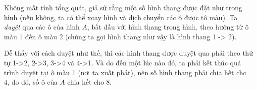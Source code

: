 \begin{ex}
{Không mất tính tổng quát, giả sử rằng một số hình thang được đặt như trong hình (nếu không, ta có thể xoay hình và dịch chuyển các ô được tô màu). Ta {\it duyệt} qua các ô của  hình $A$, bắt đầu với hình thang trong hình, theo hướng từ ô màu 1 đến ô màu 2 (chúng ta gọi hình thang như vậy là hình thang 1 -> 2).

Dễ thấy với cách duyệt như thế, thì các hình thang được duyệt qua phải theo thứ tự 1->2, 2->3, 3->4 và 4->1. Và do đến một lúc nào đó, ta phải kết thúc quá trình duyệt tại ô màu 1 (nơi ta xuất phát), nên số hình thang phải chia hết cho 4, do đó, số ô của $A$ chia hết cho 8.
	}
\end{ex}


